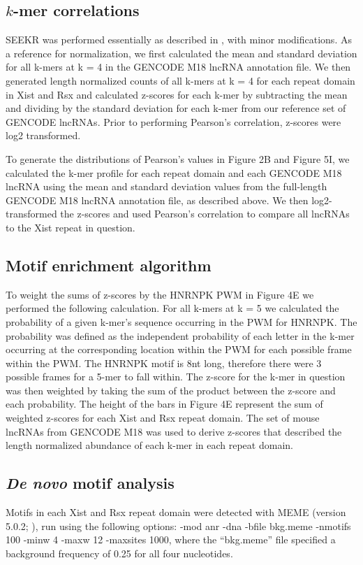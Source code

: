 \subsection{$k$-mer correlations}
SEEKR was performed essentially as described in \cite{Kirk2018FunctionalContent}, with minor modifications. As a reference for normalization, we first calculated the mean and standard deviation for all k-mers at k = 4 in the GENCODE M18 lncRNA annotation file. We then generated length normalized counts of all k-mers at k = 4 for each repeat domain in Xist and Rsx and calculated z-scores for each k-mer by subtracting the mean and dividing by the standard deviation for each k-mer from our reference set of GENCODE lncRNAs. Prior to performing Pearson’s correlation, z-scores were log2 transformed. 

To generate the distributions of Pearson’s values in Figure 2B and Figure 5I, we calculated the k-mer profile for each repeat domain and each GENCODE M18 lncRNA using the mean and standard deviation values from the full-length GENCODE M18 lncRNA annotation file, as described above. We then log2-transformed the z-scores and used Pearson’s correlation to compare all lncRNAs to the Xist repeat in question. 
\subsection{Motif enrichment algorithm}

To weight the sums of z-scores by the HNRNPK PWM in Figure 4E we performed the following calculation. For all k-mers at k = 5 we calculated the probability of a given k-mer’s sequence occurring in the PWM for HNRNPK. The probability was defined as the independent probability of each letter in the k-mer occurring at the corresponding location within the PWM for each possible frame within the PWM. The HNRNPK motif is 8nt long, therefore there were 3 possible frames for a 5-mer to fall within. The z-score for the k-mer in question was then weighted by taking the sum of the product between the z-score and each probability. The height of the bars in Figure 4E represent the sum of weighted z-scores for each Xist and Rsx repeat domain. The set of mouse lncRNAs from GENCODE M18 was used to derive z-scores that described the length normalized abundance of each k-mer in each repeat domain.  

\subsection{\emph{De novo} motif analysis}
Motifs in each Xist and Rsx repeat domain were detected with MEME (version 5.0.2; \cite{Bailey2009MEMESearching}), run using the following options: -mod anr -dna -bfile bkg.meme -nmotifs 100 -minw
4 -maxw 12 -maxsites 1000, where the “bkg.meme” file specified a background frequency of 0.25 for all four nucleotides.

